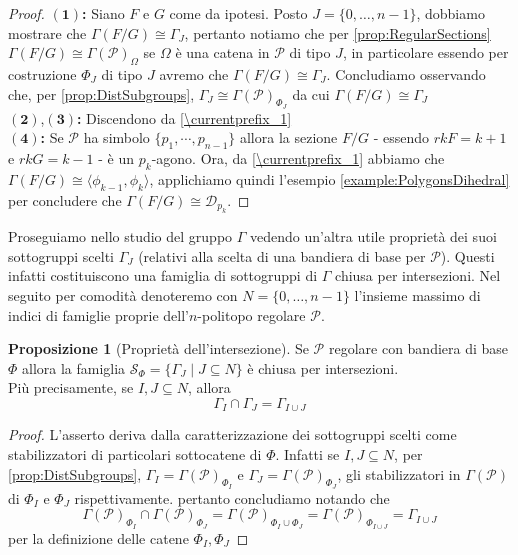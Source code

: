 \documentclass[a4paper,12pt]{report}
\newcommand{\p}{\mathcal{P}}
\theoremstyle{plain}
\theoremstyle{definition}
\newtheorem{prop}[teo]{Proposizione}
\newcommand\localref[1]{\ref{\currentprefix_#1}}
\newcommand\point[1]{$\bm{(#1)}$\textbf{: }}
\begin{document}
\begin{proof}
\point{1}Siano $F$ e $G$ come da ipotesi. Posto $J=\{0,\dots,n-1\}$, dobbiamo mostrare che $\Gamma(F/G)\cong\Gamma_J$, pertanto notiamo che per
\ref{prop:RegularSections} $\Gamma(F/G)\cong\Gamma(\p)_\Omega$ se $\Omega$ \`e una catena in $\p$ di tipo $J$, in particolare essendo per costruzione
$\Phi_J$ di tipo $J$ avremo che $\Gamma(F/G)\cong\Gamma_J$. Concludiamo osservando che, per \ref{prop:DistSubgroups}, $\Gamma_J\cong\Gamma(\p)_{\Phi_J}$
da cui $\Gamma(F/G)\cong\Gamma_J$\\
$\bm{(2)}$,\point{3} Discendono da \localref{1}\\
\point{4}Se $\p$ ha simbolo $\{p_1,\cdots,p_{n-1}\}$ allora la sezione $F/G$ - essendo $rkF=k+1$ e $rkG=k-1$ - \`e un 
$p_k$-agono. Ora, da \localref{1} abbiamo che $\Gamma(F/G)\cong\langle\phi_{k-1},\phi_k\rangle$, applichiamo quindi l'esempio \ref{example:PolygonsDihedral}
per concludere che $\Gamma(F/G)\cong\mathcal{D}_{p_k}$.
\end{proof}
Proseguiamo nello studio del gruppo $\Gamma$ vedendo un'altra utile propriet\`a dei suoi sottogruppi scelti $\Gamma_J$ (relativi alla scelta di una
bandiera di base per $\p$). Questi infatti costituiscono una famiglia di sottogruppi di $\Gamma$ chiusa per intersezioni. Nel seguito per comodit\`a
denoteremo con $N=\{0,\dots,n-1\}$ l'insieme massimo di indici di famiglie proprie dell'$n$-politopo regolare $\p$.
\begin{prop}[Propriet\`a dell'intersezione]
\label{prop:IntersectionProperty}
Se $\p$ regolare con bandiera di base $\Phi$ allora la famiglia $\mathcal{S}_\Phi=\{\Gamma_J\mid J\subseteq N\}$ \`e chiusa per intersezioni.\\
Pi\`u precisamente, se $I,J\subseteq N$, allora
\begin{equation*}
\Gamma_I\cap\Gamma_J=\Gamma_{I\cup J}
\end{equation*}
\begin{proof}
L'asserto deriva dalla caratterizzazione dei sottogruppi scelti come stabilizzatori di particolari sottocatene di $\Phi$. Infatti
se $I,J\subseteq N$, per \ref{prop:DistSubgroups}, $\Gamma_I=\Gamma(\p)_{\Phi_I}$ e $\Gamma_J=\Gamma(\p)_{\Phi_J}$, gli stabilizzatori
in $\Gamma(\p)$ di $\Phi_I$ e $\Phi_J$ rispettivamente. pertanto concludiamo notando che
\begin{equation*}
\Gamma(\p)_{\Phi_I}\cap\Gamma(\p)_{\Phi_J}=\Gamma(\p)_{\Phi_I\cup\Phi_J}=\Gamma(\p)_{\Phi_{I\cup J}}=\Gamma_{I\cup J}
\end{equation*}
per la definizione delle catene $\Phi_I,\Phi_J$
\end{proof}
\end{prop}
\end{document}

